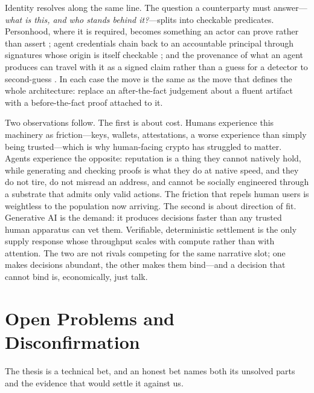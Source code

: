 \documentclass[11pt]{article}
\begin{document}
Identity resolves along the same line. The question a counterparty must
answer---\emph{what is this, and who stands behind it?}---splits into
checkable predicates. Personhood, where it is required, becomes something
an actor can prove rather than assert \citep{borge2017personhood};
agent credentials chain back to an accountable principal through
signatures whose origin is itself checkable \citep{diffie1976new};
and the provenance of what an agent produces can travel with it as a
signed claim rather than a guess for a detector to second-guess
\citep{c2pa2024}. In each case the move is the same as the move that
defines the whole architecture: replace an after-the-fact judgement about
a fluent artifact with a before-the-fact proof attached to it.

Two observations follow. The first is about cost. Humans experience this
machinery as friction---keys, wallets, attestations, a worse experience
than simply being trusted---which is why human-facing crypto has
struggled to matter. Agents experience the opposite: reputation is a
thing they cannot natively hold, while generating and checking proofs is
what they do at native speed, and they do not tire, do not misread an
address, and cannot be socially engineered through a substrate that
admits only valid actions. The friction that repels human users is
weightless to the population now arriving. The second is about direction
of fit. Generative AI is the demand: it produces decisions faster than
any trusted human apparatus can vet them. Verifiable, deterministic
settlement is the only supply response whose throughput scales with
compute rather than with attention. The two are not rivals competing for
the same narrative slot; one makes decisions abundant, the other makes
them bind---and a decision that cannot bind is, economically, just
talk.

\section{Open Problems and Disconfirmation}
\label{sec:open}

The thesis is a technical bet, and an honest bet names both its unsolved
parts and the evidence that would settle it against us.
\end{document}
